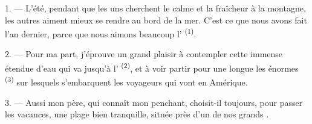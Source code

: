 %
%
%
%

\VUsaut{4.0mm}
\VUsaut{3.0mm}
\VUsaut{3.0mm}

1. --- L'été, pendant que les uns cherchent le calme et la fraîcheur à la
montagne, les autres aiment mieux se rendre au bord de la mer. C'est ce que nous
avons fait l'an dernier, parce que nous aimons beaucoup l'
\textsuperscript{(1)}.

2. --- Pour ma part, j'éprouve un grand plaisir à contempler cette immense
étendue d'eau qui va jusqu'à l' \textsuperscript{(2)}, et à voir
partir pour une longue  les énormes 
\textsuperscript{(3)} sur lesquels s'embarquent les voyageurs qui vont en
Amérique.

3. --- Aussi mon père, qui connaît mon penchant, choisit-il toujours, pour
passer les vacances, une plage bien tranquille, située près d'un de nos grands
.

